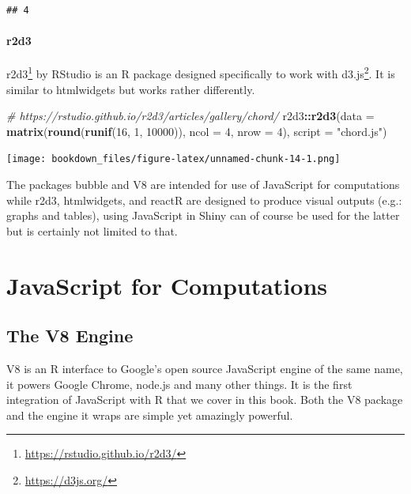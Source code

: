 \documentclass[
]{krantz}
\makeatletter
\newenvironment{Shaded}{\begin{snugshade}}{\end{snugshade}}
\newcommand{\CommentTok}[1]{\textcolor[rgb]{0.37,0.37,0.37}{\textit{#1}}}
\newcommand{\DataTypeTok}[1]{\textcolor[rgb]{0.27,0.27,0.27}{#1}}
\newcommand{\DecValTok}[1]{\textcolor[rgb]{0.06,0.06,0.06}{#1}}
\newcommand{\KeywordTok}[1]{\textcolor[rgb]{0.27,0.27,0.27}{\textbf{#1}}}
\newcommand{\NormalTok}[1]{#1}
\newcommand{\OperatorTok}[1]{\textcolor[rgb]{0.43,0.43,0.43}{\textbf{#1}}}
\newcommand{\StringTok}[1]{\textcolor[rgb]{0.5,0.5,0.5}{#1}}
\renewcommand{\href}[2]{#2\footnote{\url{#1}}}
\newenvironment{kframe}{%
\medskip{}
\setlength{\fboxsep}{.8em}
 \def\at@end@of@kframe{}%
 \ifinner\ifhmode%
  \def\at@end@of@kframe{\end{minipage}}%
  \begin{minipage}{\columnwidth}%
 \fi\fi%
 \def\FrameCommand##1{\hskip\@totalleftmargin \hskip-\fboxsep
 \colorbox{shadecolor}{##1}\hskip-\fboxsep
     \hskip-\linewidth \hskip-\@totalleftmargin \hskip\columnwidth}%
 \MakeFramed {\advance\hsize-\width
   \@totalleftmargin\z@ \linewidth\hsize
   \@setminipage}}%
 {\par\unskip\endMakeFramed%
 \at@end@of@kframe}
\renewenvironment{Shaded}{\begin{kframe}}{\end{kframe}}
\makeatother
\begin{document}
\begin{verbatim}
## 4
\end{verbatim}

\hypertarget{r2d3}{%
\subsection*{r2d3}\label{r2d3}}


\href{https://rstudio.github.io/r2d3/}{r2d3} \citep{R-r2d3} by RStudio is an R package designed specifically to work with \href{https://d3js.org/}{d3.js}. It is similar to htmlwidgets but works rather differently.

\begin{Shaded}
\begin{Highlighting}[]
\CommentTok{\# https://rstudio.github.io/r2d3/articles/gallery/chord/}
\NormalTok{r2d3}\OperatorTok{::}\KeywordTok{r2d3}\NormalTok{(}\DataTypeTok{data =} \KeywordTok{matrix}\NormalTok{(}\KeywordTok{round}\NormalTok{(}\KeywordTok{runif}\NormalTok{(}\DecValTok{16}\NormalTok{, }\DecValTok{1}\NormalTok{, }\DecValTok{10000}\NormalTok{)), }\DataTypeTok{ncol =} \DecValTok{4}\NormalTok{, }\DataTypeTok{nrow =} \DecValTok{4}\NormalTok{), }\DataTypeTok{script =} \StringTok{"chord.js"}\NormalTok{)}
\end{Highlighting}
\end{Shaded}

\texttt{[image: bookdown\_files/figure-latex/unnamed-chunk-14-1.png]}

The packages bubble and V8 are intended for use of JavaScript for computations while r2d3, htmlwidgets, and reactR are designed to produce visual outputs (e.g.: graphs and tables), using JavaScript in Shiny can of course be used for the latter but is certainly not limited to that.

\hypertarget{part-javascript-for-computations}{%
\part{JavaScript for Computations}\label{part-javascript-for-computations}}

\hypertarget{the-v8-engine}{%
\chapter{The V8 Engine}\label{the-v8-engine}}

V8 is an R interface to Google's open source JavaScript engine of the same name, it powers Google Chrome, node.js and many other things. It is the first integration of JavaScript with R that we cover in this book. Both the V8 package and the engine it wraps are simple yet amazingly powerful.
\end{document}
